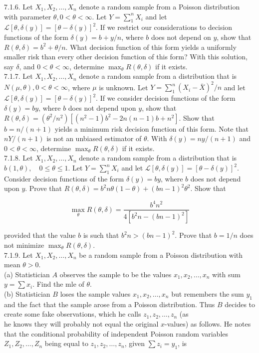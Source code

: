 7.1.6. Let $X_{1}, X_{2}, \ldots, X_{n}$ denote a random sample from a Poisson distribution with parameter $\theta, 0<\theta<\infty$. Let $Y=\sum_{1}^{n} X_{i}$ and let $\mathcal{L}[\theta, \delta(y)]=[\theta-\delta(y)]^{2}$. If we restrict our considerations to decision functions of the form $\delta(y)=b+y / n$, where $b$ does not depend on $y$, show that $R(\theta, \delta)=b^{2}+\theta / n$. What decision function of this form yields a uniformly smaller risk than every other decision function of this form? With this solution, say $\delta$, and $0<\theta<\infty$, determine $\max _{\theta} R(\theta, \delta)$ if it exists.\\
7.1.7. Let $X_{1}, X_{2}, \ldots, X_{n}$ denote a random sample from a distribution that is $N(\mu, \theta), 0<\theta<\infty$, where $\mu$ is unknown. Let $Y=\sum_{1}^{n}\left(X_{i}-\bar{X}\right)^{2} / n$ and let $\mathcal{L}[\theta, \delta(y)]=[\theta-\delta(y)]^{2}$. If we consider decision functions of the form $\delta(y)=b y$, where $b$ does not depend upon $y$, show that $R(\theta, \delta)=\left(\theta^{2} / n^{2}\right)\left[\left(n^{2}-1\right) b^{2}-2 n(n-1) b+n^{2}\right]$. Show that $b=n /(n+1)$ yields a minimum risk decision function of this form. Note that $n Y /(n+1)$ is not an unbiased estimator of $\theta$. With $\delta(y)=n y /(n+1)$ and $0<\theta<\infty$, determine $\max _{\theta} R(\theta, \delta)$ if it exists.\\
7.1.8. Let $X_{1}, X_{2}, \ldots, X_{n}$ denote a random sample from a distribution that is $b(1, \theta), \quad 0 \leq \theta \leq 1$. Let $Y=\sum_{1}^{n} X_{i}$ and let $\mathcal{L}[\theta, \delta(y)]=[\theta-\delta(y)]^{2}$. Consider decision functions of the form $\delta(y)=b y$, where $b$ does not depend upon $y$. Prove that $R(\theta, \delta)=b^{2} n \theta(1-\theta)+(b n-1)^{2} \theta^{2}$. Show that

$$
\max _{\theta} R(\theta, \delta)=\frac{b^{4} n^{2}}{4\left[b^{2} n-(b n-1)^{2}\right]}
$$

provided that the value $b$ is such that $b^{2} n>(b n-1)^{2}$. Prove that $b=1 / n$ does not minimize $\max _{\theta} R(\theta, \delta)$.\\
7.1.9. Let $X_{1}, X_{2}, \ldots, X_{n}$ be a random sample from a Poisson distribution with mean $\theta>0$.\\
(a) Statistician $A$ observes the sample to be the values $x_{1}, x_{2}, \ldots, x_{n}$ with sum $y=\sum x_{i}$. Find the mle of $\theta$.\\
(b) Statistician $B$ loses the sample values $x_{1}, x_{2}, \ldots, x_{n}$ but remembers the sum $y_{1}$ and the fact that the sample arose from a Poisson distribution. Thus $B$ decides to create some fake observations, which he calls $z_{1}, z_{2}, \ldots, z_{n}$ (as\\
he knows they will probably not equal the original $x$-values) as follows. He notes that the conditional probability of independent Poisson random variables $Z_{1}, Z_{2}, \ldots, Z_{n}$ being equal to $z_{1}, z_{2}, \ldots, z_{n}$, given $\sum z_{i}=y_{1}$, is

